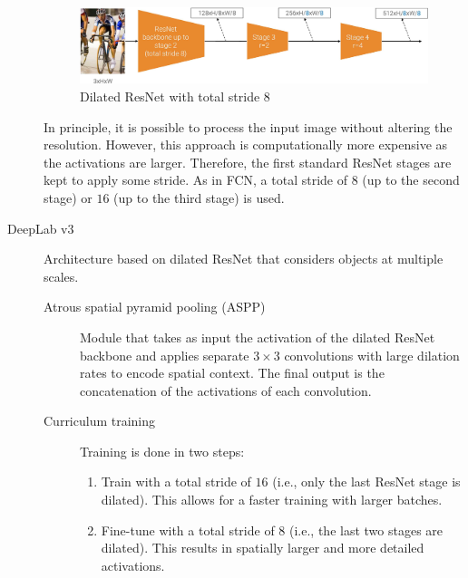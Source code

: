 \begin{description}
        \begin{figure}[H]
            \centering
            \includegraphics[width=0.9\linewidth]{./img/_dilated_resnet.jpg}
            \caption{Dilated ResNet with total stride $8$}
        \end{figure}

        \begin{remark}
            In principle, it is possible to process the input image without altering the resolution. However, this approach is computationally more expensive as the activations are larger. Therefore, the first standard ResNet stages are kept to apply some stride. As in FCN, a total stride of $8$ (up to the second stage) or $16$ (up to the third stage) is used.
        \end{remark}


    \item[DeepLab v3] 
        Architecture based on dilated ResNet that considers objects at multiple scales.

        \begin{description}
            \item[Atrous spatial pyramid pooling (ASPP)] 
                Module that takes as input the activation of the dilated ResNet backbone and applies separate $3 \times 3$ convolutions with large dilation rates to encode spatial context. The final output is the concatenation of the activations of each convolution.

            \item[Curriculum training]
                Training is done in two steps:
                \begin{enumerate}
                    \item Train with a total stride of $16$ (i.e., only the last ResNet stage is dilated). This allows for a faster training with larger batches.
                    \item Fine-tune with a total stride of $8$ (i.e., the last two stages are dilated). This results in spatially larger and more detailed activations.
                \end{enumerate}
        \end{description}


\end{description}
